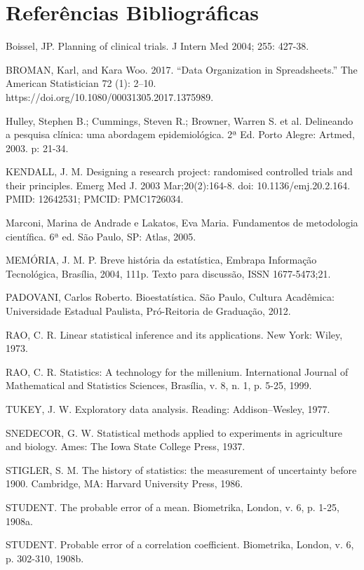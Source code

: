 \chapter{Referências Bibliográficas}


Boissel, JP. Planning of clinical trials. J Intern Med 2004; 255: 427-38.\vskip0.3cm

BROMAN, Karl, and Kara Woo. 2017. “Data Organization in Spreadsheets.” The American Statistician 72 (1): 2–10. https://doi.org/10.1080/00031305.2017.1375989.\vskip0.3cm

Hulley, Stephen B.; Cummings, Steven R.; Browner, Warren S. et al. Delineando a pesquisa clínica: uma abordagem epidemiológica. 2ª Ed. Porto Alegre: Artmed, 2003. p: 21-34.\vskip0.3cm


KENDALL, J. M. Designing a research project: randomised controlled trials and their principles. Emerg Med J. 2003 Mar;20(2):164-8. doi: 10.1136/emj.20.2.164. PMID: 12642531; PMCID: PMC1726034.\vskip0.3cm

Marconi, Marina de Andrade e Lakatos, Eva Maria. Fundamentos de metodologia científica. 6ª ed. São Paulo, SP: Atlas, 2005.\vskip0.3cm

MEMÓRIA, J. M. P. Breve história da estatística, Embrapa Informação Tecnológica, Brasília, 2004, 111p. Texto para discussão, ISSN 1677-5473;21. \vskip0.3cm


PADOVANI, Carlos Roberto. Bioestatística. São Paulo, Cultura Acadêmica:
Universidade Estadual Paulista, Pró-Reitoria de Graduação, 2012.\vskip0.3cm

RAO, C. R. Linear statistical inference and its applications. New York: Wiley, 1973.\vskip0.3cm

RAO, C. R. Statistics: A technology for the millenium. International Journal of Mathematical and Statistics Sciences, Brasília, v. 8, n. 1, p. 5-25, 1999.\vskip0.3cm

TUKEY, J. W. Exploratory data analysis. Reading: Addison–Wesley, 1977.\vskip0.3cm

SNEDECOR, G. W. Statistical methods applied to experiments in agriculture and biology. Ames: The Iowa State College Press, 1937. \vskip0.3cm

STIGLER, S. M. The history of statistics: the measurement of uncertainty before 1900. Cambridge, MA: Harvard University Press, 1986. \vskip0.3cm

STUDENT. The probable error of a mean. Biometrika, London, v. 6, p. 1-25, 1908a.\vskip0.3cm

STUDENT. Probable error of a correlation coefficient. Biometrika, London, v. 6, p. 302-310, 1908b.\vskip0.3cm


